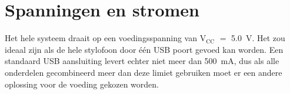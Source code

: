 \documentclass[12pt, a4paper, dutch]{article}
\newcommand{\sub}[1]{$_{\text{#1}}$}
\begin{document}
% 
% 

\section{Spanningen en stromen}


Het hele systeem draait op een voedingsspanning van V\sub{CC} $=$ \SI{5.0}{\volt}.
Het zou ideaal zijn als de hele stylofoon door \'e\'en USB poort gevoed kan worden.
Een standaard USB aansluiting levert echter niet meer dan \SI{500}{\milli\ampere},
dus als alle onderdelen gecombineerd meer dan deze limiet gebruiken moet er een
andere oplossing voor de voeding gekozen worden.
\end{document}
